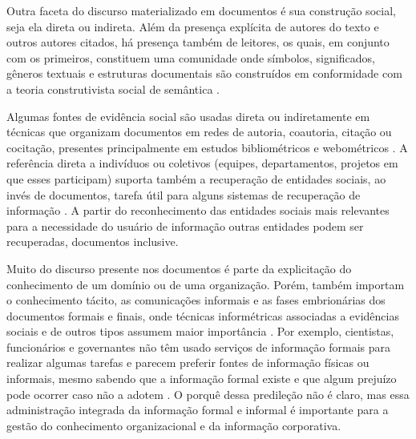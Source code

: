 Outra faceta do discurso materializado em documentos é sua construção social, seja ela direta ou indireta. Além da presença explícita de autores do texto e outros autores citados, há presença também de leitores, os quais, em conjunto com os primeiros, constituem uma comunidade onde símbolos, significados, gêneros textuais e estruturas documentais são construídos em conformidade com a teoria construtivista social de semântica \cite{talamo2001,hjorland2002domain}. 

Algumas fontes de evidência social são usadas direta ou indiretamente em técnicas que organizam documentos em redes de autoria, coautoria, citação ou cocitação, presentes principalmente em estudos bibliométricos \cite{vanti02} e webométricos \cite{page99}. A referência direta a indivíduos ou coletivos (equipes, departamentos, projetos em que esses participam) suporta também a recuperação de entidades sociais, ao invés de documentos, tarefa útil para alguns sistemas de recuperação de informação \cite{peopleSearch12}. A partir do reconhecimento das entidades sociais mais relevantes para a necessidade do usuário de informação outras entidades podem ser recuperadas, documentos inclusive.

Muito do discurso presente nos documentos é parte da explicitação do conhecimento de um domínio ou de uma organização. Porém, também importam o conhecimento tácito, as comunicações informais e as fases embrionárias dos documentos formais e finais, onde técnicas informétricas associadas a evidências sociais e de outros tipos assumem maior importância \cite{vanti02,alvarenga12}. Por exemplo, cientistas, funcionários e governantes não têm usado serviços de informação formais para realizar algumas tarefas e parecem preferir fontes de informação físicas ou informais, mesmo sabendo que a informação formal existe e que algum prejuízo pode ocorrer caso não a adotem \cite{dealwis2001singapore,nunes2006,choo2008,ofarrill2010,marcella2012}. O porquê dessa predileção não é claro, mas essa administração integrada da informação formal e informal é importante para a gestão do conhecimento organizacional e da informação corporativa.

